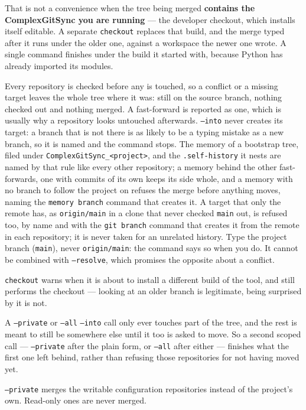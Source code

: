 That is not a convenience when the tree being merged \textbf{contains the
ComplexGitSync you are running} --- the developer checkout, which installs
itself editable. A separate \texttt{checkout} replaces that build, and the
merge typed after it runs under the older one, against a workspace the newer
one wrote. A single command finishes under the build it started with,
because Python has already imported its modules.

Every repository is checked before any is touched, so a conflict or a
missing target leaves the whole tree where it was: still on the source
branch, nothing checked out and nothing merged. A fast-forward is reported
as one, which is usually why a repository looks untouched afterwards.
\texttt{--into} never creates its target: a branch that is not there is as
likely to be a typing mistake as a new branch, so it is named and the
command stops. The memory of a bootstrap tree, filed under
\texttt{ComplexGitSync\_<project>}, and the \texttt{.self-history} it nests are
named by that rule like every other repository; a memory behind the other
fast-forwards, one with commits of its own keeps its side whole, and a memory
with no branch to follow the project on refuses the merge before anything
moves, naming the \texttt{memory branch} command that creates it. A target that only the remote has, as \texttt{origin/main}
in a clone that never checked \texttt{main} out, is refused too, by name and
with the \texttt{git branch} command that creates it from the remote in each
repository; it is never taken for an unrelated history. Type the project
branch (\texttt{main}), never \texttt{origin/main}: the command says so when
you do. It cannot be combined with \texttt{--resolve}, which promises the
opposite about a conflict.

\texttt{checkout} warns when it is about to install a different build of the
tool, and still performs the checkout --- looking at an older branch is
legitimate, being surprised by it is not.

A \texttt{--private} or \texttt{--all} \texttt{--into} call only ever
touches part of the tree, and the rest is meant to still be somewhere else
until it too is asked to move. So a second scoped call --- \texttt{--private}
after the plain form, or \texttt{--all} after either --- finishes what the
first one left behind, rather than refusing those repositories for not
having moved yet.

\texttt{--private} merges the writable configuration repositories instead
of the project's own. Read-only ones are never merged.

